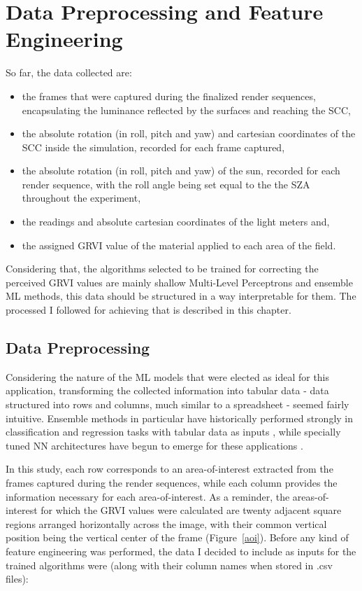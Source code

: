 \chapter{Data Preprocessing and Feature Engineering}
\label{chap6}

So far, the data collected are:

\begin{itemize}
    \item the frames that were captured during the finalized render sequences, encapsulating the luminance reflected by the surfaces and reaching the SCC,
    \item the absolute rotation (in roll, pitch and yaw) and cartesian coordinates of the SCC inside the simulation, recorded for each frame captured,
    \item the absolute rotation (in roll, pitch and yaw) of the sun, recorded for each render sequence, with the roll angle being set equal to the the SZA throughout the experiment,
    \item the readings and absolute cartesian coordinates of the light meters and,
    \item the assigned GRVI value of the material applied to each area of the field.
\end{itemize}

Considering that, the algorithms selected to be trained for correcting the perceived GRVI values are mainly shallow Multi-Level Perceptrons and ensemble ML methods, this data should be structured in a way interpretable for them. The processed I followed for achieving that is described in this chapter.

\section{Data Preprocessing}
\label{dp}

Considering the nature of the ML models that were elected as ideal for this application, transforming the collected information into tabular data - data structured into rows and columns, much similar to a spreadsheet - seemed fairly intuitive. Ensemble methods in particular have historically performed strongly in classification and regression tasks with tabular data as inputs \cite{tabdata-gen}, while specially tuned NN architectures have begun to emerge for these applications \cite{tabnet, tabdata-nn}. 


In this study, each row corresponds to an area-of-interest extracted from the frames captured during the render sequences, while each column provides the information necessary for each area-of-interest. As a reminder, the areas-of-interest for which the GRVI values were calculated are twenty adjacent square regions arranged horizontally across the image, with their common vertical position being the vertical center of the frame (Figure~\ref{aoi}). Before any kind of feature engineering was performed, the data I decided to include as inputs for the trained algorithms were (along with their column names when stored in .csv files):

